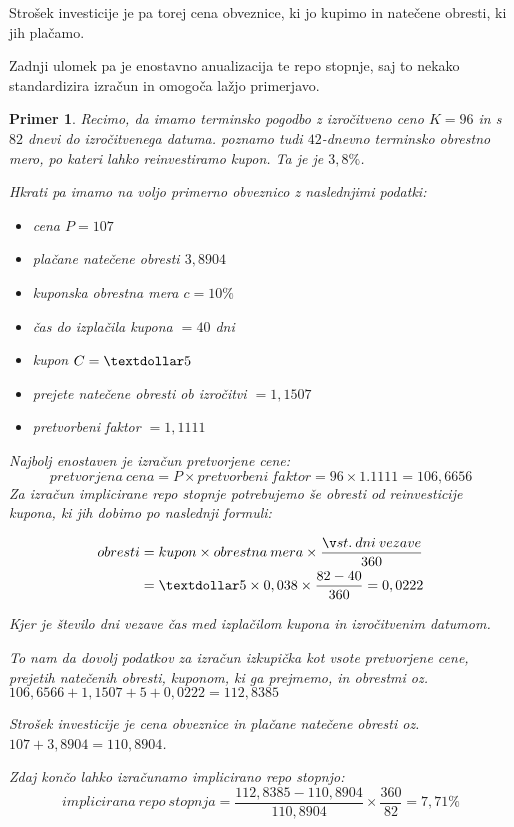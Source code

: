 \documentclass[a4paper]{article}
\newtheorem{primer}{Primer}
\begin{document}
Strošek investicije je pa torej cena obveznice, ki jo kupimo in natečene obresti, ki jih plačamo.

Zadnji ulomek pa je enostavno anualizacija te repo stopnje, saj to nekako standardizira izračun
in omogoča lažjo primerjavo. 

\begin{primer}
    Recimo, da imamo terminsko pogodbo z izročitveno ceno $K = 96$ in s $82$ dnevi do izročitvenega
    datuma. poznamo tudi $42$-dnevno terminsko obrestno mero, po kateri lahko reinvestiramo kupon.
    Ta je je $3,8\%$.

    Hkrati pa imamo na voljo primerno obveznico z naslednjimi podatki:

    \begin{itemize}
        \item cena $P = 107$
        \item plačane natečene obresti $3,8904$
        \item kuponska obrestna mera $c = 10\%$
        \item čas do izplačila kupona $ = 40$ dni
        \item kupon $C = \textdollar5$
        \item prejete natečene obresti ob izročitvi $ = 1,1507$
        \item pretvorbeni faktor $ = 1,1111$
    \end{itemize}

    Najbolj enostaven je izračun pretvorjene cene:
    $$ pretvorjena\:cena = P \times pretvorbeni\:faktor = 96 \times 1.1111 = 106,6656 $$
    Za izračun implicirane repo stopnje potrebujemo še obresti od reinvesticije kupona, ki jih
    dobimo po naslednji formuli:
    
    \begin{align*}
        obresti
        &= kupon \times obrestna\:mera \times \frac{št.\:dni\:vezave}{360} \\
        &= \textdollar5 \times 0,038 \times \frac{82 - 40}{360} = 0,0222 
    \end{align*}

    Kjer je število dni vezave čas med izplačilom kupona in izročitvenim datumom. 

    To nam da dovolj podatkov za izračun izkupička kot vsote pretvorjene cene, prejetih natečenih
    obresti, kuponom, ki ga prejmemo, in obrestmi oz. $106,6566 + 1,1507 + 5 + 0,0222 = 112,8385$

    Strošek investicije je cena obveznice in plačane natečene obresti oz. $107 + 3,8904 = 110,8904$.

    Zdaj končo lahko izračunamo implicirano repo stopnjo:
    $$ implicirana\:repo\:stopnja = \frac{112,8385 - 110,8904}{110,8904} \times \frac{360}{82} 
    = 7,71\% $$
    
\end{primer}
\end{document}
